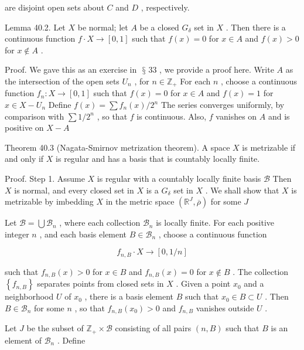 \documentclass[10pt]{article}
\begin{document}
are disjoint open sets about \(C\) and \(D\) , respectively.

Lemma 40.2. Let \(X\) be normal; let \(A\) be a closed \({G}_{\delta }\) set in \(X\) . Then there is a continuous function \(f \cdot  X \rightarrow  \left\lbrack  {0,1}\right\rbrack\) such that \(f\left( x\right)  = 0\) for \(x \in  A\) and \(f\left( x\right)  > 0\) for \(x \notin  A\) .

Proof. We gave this as an exercise in \(\text{ § }{33}\) , we provide a proof here. Write \(A\) as the intersection of the open sets \({U}_{n}\) , for \(n \in  {\mathbb{Z}}_{ + }\) For each \(n\) , choose a continuous function \({f}_{n} : X \rightarrow  \left\lbrack  {0,1}\right\rbrack\) such that \(f\left( x\right)  = 0\) for \(x \in  A\) and \(f\left( x\right)  = 1\) for \(x \in  X - {U}_{n}\) Define \(f\left( x\right)  = \sum {f}_{n}\left( x\right) /{2}^{n}\) The series converges uniformly, by comparison with \(\sum 1/{2}^{n}\) , so that \(f\) is continuous. Also, \(f\) vanishes on \(A\) and is positive on \(X - A\)

Theorem 40.3 (Nagata-Smirnov metrization theorem). A space \(X\) is metrizable if and only if \(X\) is regular and has a basis that is countably locally finite.

Proof. Step 1. Assume \(X\) is regular with a countably locally finite basis \(\mathcal{B}\) Then \(X\) is normal, and every closed set in \(X\) is a \({G}_{\delta }\) set in \(X\) . We shall show that \(X\) is metrizable by imbedding \(X\) in the metric space \(\left( {{\mathbb{R}}^{J},\overline{\rho }}\right)\) for some \(J\)

Let \(\mathcal{B} = \bigcup {\mathcal{B}}_{n}\) , where each collection \({\mathcal{B}}_{n}\) is locally finite. For each positive integer \(n\) , and each basis element \(B \in  {\mathcal{B}}_{n}\) , choose a continuous function

\[
{f}_{n,B} \cdot  X \rightarrow  \left\lbrack  {0,1/n}\right\rbrack
\]

such that \({f}_{n,B}\left( x\right)  > 0\) for \(x \in  B\) and \({f}_{n,B}\left( x\right)  = 0\) for \(x \notin  B\) . The collection \(\left\{  {f}_{n,B}\right\}\) separates points from closed sets in \(X\) . Given a point \({x}_{0}\) and a neighborhood \(U\) of \({x}_{0}\) , there is a basis element \(B\) such that \({x}_{0} \in  B \subset  U\) . Then \(B \in  {\mathcal{B}}_{n}\) for some \(n\) , so that \({f}_{n,B}\left( {x}_{0}\right)  > 0\) and \({f}_{n,B}\) vanishes outside \(U\) .

Let \(J\) be the subset of \({\mathbb{Z}}_{ + } \times  \mathcal{B}\) consisting of all pairs \(\left( {n,B}\right)\) such that \(B\) is an element of \({\mathcal{B}}_{n}\) . Define
\end{document}
